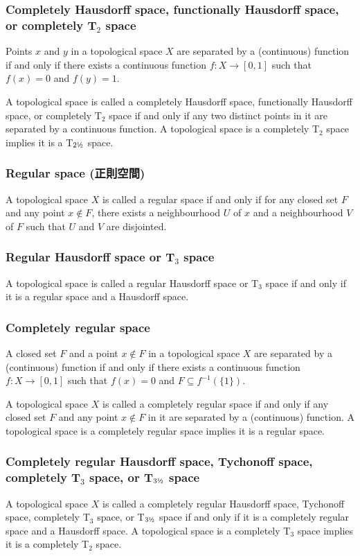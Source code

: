 \documentclass[a4paper,12pt]{article}
\begin{document}
\subsubsection{Completely Hausdorff space, functionally Hausdorff space, or completely T$_2$ space}
Points $x$ and $y$ in a topological space $X$ are separated by a (continuous) function if and only if there exists a continuous function $f\colon X\to [0,1]$ such that $f(x)=0$ and $f(y)=1$.

A topological space is called a completely Hausdorff space, functionally Hausdorff space, or completely T$_2$ space if and only if any two distinct points in it are separated by a continuous function. A topological space is a completely T$_2$ space implies it is a T\(_{2\text{\textonehalf}}\) space.
\subsubsection{Regular space (正則空間)}
A topological space $X$ is called a regular space if and only if for any closed set $F$ and any point $x\notin F$, there exists a neighbourhood $U$ of $x$ and a neighbourhood $V$ of $F$ such that $U$ and $V$ are disjointed.
\subsubsection{Regular Hausdorff space or T$_3$ space}
A topological space is called a regular Hausdorff space or T$_3$ space if and only if it is a regular space and a Hausdorff space.
\subsubsection{Completely regular space}
A closed set $F$ and a point $x\notin F$ in a topological space $X$ are separated by a (continuous) function if and only if there exists a continuous function $f\colon X\to [0,1]$ such that $f(x)=0$ and $F\subseteq f^{-1}(\{1\})$.

A topological space $X$ is called a completely regular space if and only if any closed set $F$ and any point $x\notin F$ in it are separated by a (continuous) function. A topological space is a completely regular space implies it is a regular space.
\subsubsection{Completely regular Hausdorff space, Tychonoff space, completely T$_3$ space, or T\(_{3\text{\textonehalf}}\) space}
A topological space $X$ is called a completely regular Hausdorff space, Tychonoff space, completely T$_3$ space, or T\(_{3\text{\textonehalf}}\) space if and only if it is a completely regular space and a Hausdorff space. A topological space is a completely T$_3$ space implies it is a completely T$_2$ space.
\end{document}
